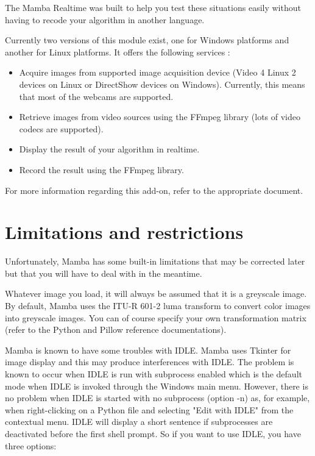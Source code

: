\documentclass[a4paper,10pt,oneside]{article}
\begin{document}
The Mamba Realtime was built to help you test these situations easily without 
having to recode your algorithm in another language.

Currently two versions of this module exist, one for Windows platforms and 
another for Linux platforms. It offers the following services :

\begin{itemize}
\item Acquire images from supported image acquisition device (Video 4 Linux 2
devices on Linux or DirectShow devices on Windows). Currently, this means that
most of the webcams are 
supported.
\item Retrieve images from video sources using the FFmpeg library (lots of video
codecs are supported).
\item Display the result of your algorithm in realtime.
\item Record the result using the FFmpeg library.
\end{itemize}



For more information regarding this add-on, refer to the appropriate document.

\pagebreak

\section{Limitations and restrictions}
\label{cha:lim_restrict}

Unfortunately, Mamba has some built-in limitations that may be corrected later
but that you will have to deal with in the meantime.

Whatever image you load, it will always be assumed that it is a greyscale image.
By default, Mamba uses the ITU-R 601-2 luma transform to convert color images 
into greyscale images. You can of course specify your own transformation matrix 
(refer to the Python and Pillow reference documentations).

Mamba is known to have some troubles with IDLE. Mamba uses
Tkinter for image display and this may produce interferences with IDLE. The
problem is known to occur when IDLE is run with subprocess enabled which is the
default mode when IDLE is invoked through the Windows main menu. However, there 
is no problem when IDLE is started with no subprocess (option -n) as, for 
example, when right-clicking on a Python file and selecting "Edit with IDLE" from
the contextual menu. IDLE will display a short sentence if subprocesses are
deactivated before the first shell prompt. So if you want to use IDLE, you have
three options:
\end{document}
